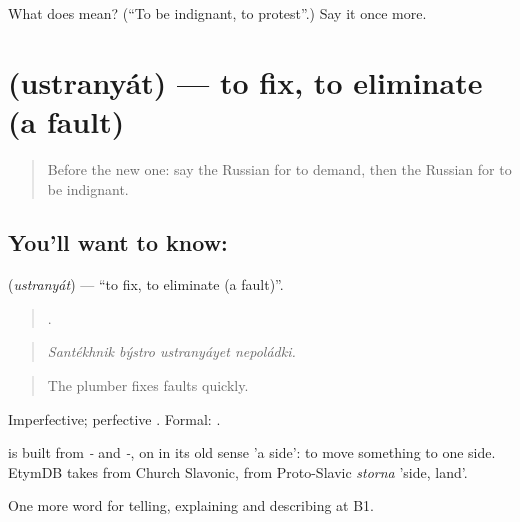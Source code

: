 \begin{tcolorbox}[breakable,colback=teal!4,colframe=teal!35!black,title={Before you move on}]
What does  mean? (\textquotedblleft{}To be indignant, to protest\textquotedblright{}.) Say it once more.
\end{tcolorbox}
\section[\texorpdfstring{\ru{устранять} (ustranyát)}{устранять (ustranyát)}]{ (ustranyát) — to fix, to eliminate (a fault)}

\label{lesson:RU-C436-ustranyat}



\begin{quote}
Before the new one: say the Russian for to demand, then the Russian for to be indignant.
\end{quote}

\subsection*{You'll want to know: }
\textbf{} (\emph{ustranyát}) — \textquotedblleft{}to fix, to eliminate (a fault)\textquotedblright{}.

\begin{quote}
   .
\end{quote}

\begin{quote}
\emph{Santékhnik býstro ustranyáyet nepoládki.}
\end{quote}

\begin{quote}
The plumber fixes faults quickly.
\end{quote}

Imperfective; perfective \emph{}. Formal: \emph{ }.

\begin{cousinweb}
\emph{} is built from \emph{-} and \emph{-}, on \emph{} in its old sense 'a side': to move something to one side. EtymDB takes \emph{} from Church Slavonic, from Proto-Slavic \emph{storna} 'side, land'.
\end{cousinweb}

\begin{grammarlens}[title={What you've built}]
One more word for telling, explaining and describing at B1.
\end{grammarlens}

